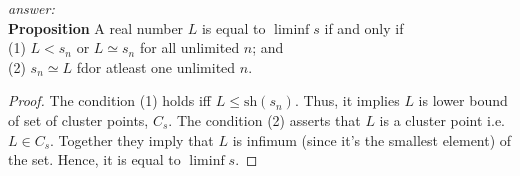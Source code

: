 \documentclass[a4paper, 11pt, openany]{book}
\theoremstyle{plain}
\newenvironment{answer}
    {\textit{answer:}}
    {}
\theoremstyle{plain}
\newcommand{\sh}{\text{sh}}
\begin{document}
  \begin{answer} $ $ \\
    \textbf{Proposition} A real number $L$ is equal to $\liminf s$ if and only if \\
    (1) $L<s_n$ or $L \simeq s_n$ for all unlimited $n$; and \\
    (2) $s_n \simeq L$ fdor atleast one unlimited $n$. \\
  \begin{proof} 
    The condition (1) holds iff $L \leq \sh(s_n)$. Thus, it implies $L$ is lower bound of set of cluster points, $C_s$. The condition (2) asserts that $L$ is a cluster point i.e. $L \in C_s$. Together they imply that $L$ is infimum (since it's the smallest element) of the set. Hence, it is equal to $\liminf s$.  
  \end{proof}
  \end{answer}
  
\end{document}
